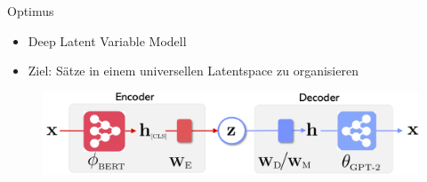 \begin{frame}{Optimus}
  \begin{itemize}
    \item Deep Latent Variable Modell
    \item Ziel: Sätze in einem universellen Latentspace zu organisieren
  \end{itemize}
\begin{figure}[h]
    \centering
    \includegraphics[width=\textwidth]{bilder/optimus_scheme}
\end{figure}




\end{frame}

